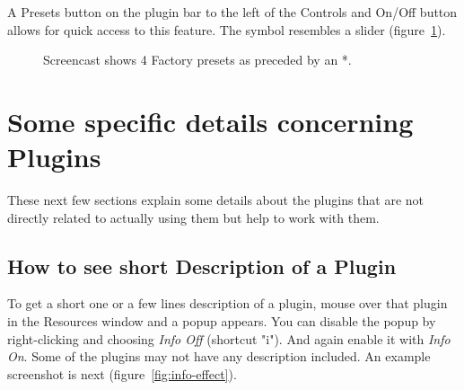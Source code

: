 A Presets button on the plugin bar to the left of the Controls and On/Off button allows for quick access to this feature. The symbol resembles a slider (figure~\ref{fig:preset02}).

\begin{figure}[htpb]
    \centering
    \caption{Screencast shows 4 Factory presets as preceded by an *.}
    \label{fig:preset02}
\end{figure}

\section{Some specific details concerning Plugins}%
\label{sec:specific_details_plugins}

These next few sections explain some details about the plugins that are not directly related to actually using them but help to work with them.

\subsection{How to see short Description of a Plugin}%
\label{sub:short_description_plugin}

To get a short one or a few lines description of a plugin, mouse over that plugin in the Resources window and a popup appears. You can disable the popup by right-clicking and choosing \textit{Info Off} (shortcut "i"). And again enable it with \textit{Info On}. Some of the plugins may not have any description included. An example screenshot is next (figure~\ref{fig:info-effect}).

